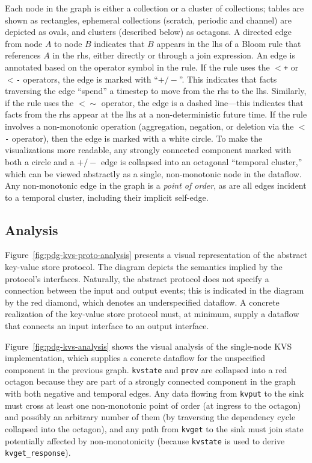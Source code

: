Each node in the graph is either a collection or a cluster of collections;
tables are shown as rectangles, ephemeral collections (scratch, periodic and
channel) are depicted as ovals, and clusters (described below) as octagons. A
directed edge from node $A$ to node $B$ indicates that $B$ appears in the lhs of
a Bloom rule that references $A$ in the rhs, either directly or through a join
expression. An edge is annotated based on the operator symbol in the rule. If
the rule uses the \texttt{$<$+} or \texttt{$<$-} operators, the edge is marked
with ``$+/-$''. This indicates that facts traversing the edge ``spend'' a
timestep to move from the rhs to the lhs. Similarly, if the rule uses the
\texttt{$<\sim$} operator, the edge is a dashed line---this indicates that facts
from the rhs appear at the lhs at a non-deterministic future time. If the rule
involves a non-monotonic operation (aggregation, negation, or deletion via the \texttt{$<$-}
operator), then the edge is marked with a white circle.  To make the
visualizations more readable, any strongly connected component marked with both
a circle and a $+/-$ edge is collapsed into an octagonal ``temporal cluster,''
which can be viewed abstractly as a single, non-monotonic node in the
dataflow. Any non-monotonic edge in the graph is a \emph{point of order}, as are
all edges incident to a temporal cluster, including their implicit self-edge.

\subsection{Analysis}
Figure~\ref{fig:pdg-kvs-proto-analysis} presents a visual representation of the
abstract key-value store protocol. The diagram depicts the semantics implied by
the protocol's interfaces. Naturally, the abstract protocol does not specify a
connection between the input and output events; this is indicated in the diagram
by the red diamond, which denotes an underspecified dataflow. A concrete
realization of the key-value store protocol must, at minimum, supply a dataflow
that connects an input interface to an output interface.

Figure~\ref{fig:pdg-kvs-analysis} shows the visual analysis of the single-node
KVS implementation, which supplies a concrete dataflow for the unspecified
component in the previous graph.  \texttt{kvstate} and \texttt{prev} are
collapsed into a red octagon because they are part of a strongly connected
component in the graph with both negative and temporal edges.  Any data flowing
from \texttt{kvput} to the sink must cross at least one non-monotonic point of
order (at ingress to the octagon) and possibly an arbitrary number of them (by
traversing the dependency cycle collapsed into the octagon), and any path from
\texttt{kvget} to the sink must join state potentially affected by
non-monotonicity (because \texttt{kvstate} is used to derive
\texttt{kvget\_response}).

